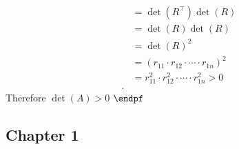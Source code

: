 \documentclass{report}
\begin{document}
\begin{itemize}
\begin{align*}
                                 &= \det(R^{\top})\det(R) \\
                                 &= \det(R)\det(R) \\
                                 &= \det(R)^{2} \\
                                 &= (r_{11}\cdot r_{12}\cdot \cdots \cdot r_{1n})^{2} \\
                                 &= r_{11}^{2}\cdot r_{12}^{2}\cdot \cdots \cdot r_{1n}^{2} > 0 \\
            .\end{align*}
            Therefore $\det(A)  > 0$ $\endpf $




    \end{itemize}


    \pagebreak 
    \subsection{Chapter 1}
    \bigbreak \noindent 
\end{document}
